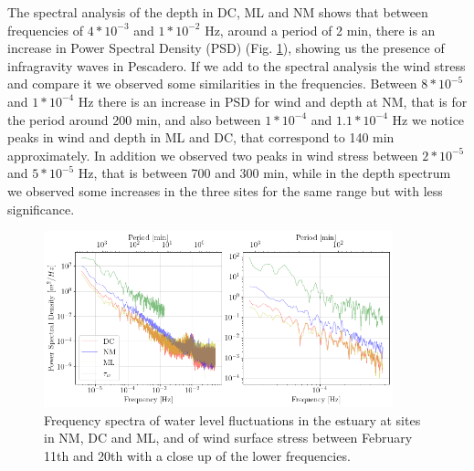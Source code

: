 \documentclass[tesis.tex]{subfiles}
\begin{document}
    The spectral analysis of the depth in DC, ML and NM shows that between frequencies of $4*10^{-3}$ and $1*10^{-2}$ Hz, around a period of 2 min, there is an increase in Power Spectral Density (PSD) (Fig. \ref{fig:freq}), showing us the presence of infragravity waves in Pescadero. If we add to the spectral analysis the wind stress and compare it we observed some similarities in the frequencies. Between $8*10^{-5}$ and $1*10^{-4}$ Hz there is an increase in PSD for wind and depth at NM, that is for the period around 200 min, and also between $1*10^{-4}$ and $1.1*10^{-4}$ Hz we notice peaks in wind and depth in ML and DC, that correspond to 140 min approximately. In addition we observed two peaks in wind stress between $2*10^{-5}$ and $5*10^{-5}$ Hz, that is between 700 and 300 min, while in the depth spectrum we observed some increases in the three sites for the same range but with less significance.
    
    \begin{figure}[h!]
      \centering
      \includegraphics[width=0.9\textwidth]{Imagenes/freqs.png}
      \caption{Frequency spectra of water level fluctuations in the estuary at sites in NM, DC and ML, and of wind surface stress between February 11th and 20th with a close up of the lower frequencies.}
      \label{fig:freq}
    \end{figure}
\end{document}
